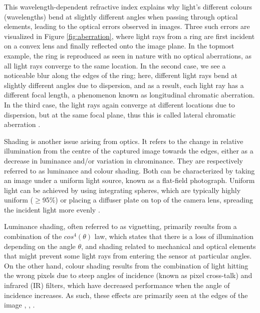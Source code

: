 This wavelength-dependent refractive index explains why light's different colours (wavelengths) bend at slightly different angles when passing through optical elements, leading to the optical errors observed in images. Three such errors are visualized in Figure  \ref{fig:aberration}, where light rays from a ring are first incident on a convex lens and finally reflected onto the image plane. In the topmost example, the ring is reproduced as seen in nature with no optical aberrations, as all light rays converge to the same location. In the second case, we see a noticeable blur along the edges of the ring; here, different light rays bend at slightly different angles due to dispersion, and as a result, each light ray has a different focal length, a phenomenon known as longitudinal chromatic aberration. In the third case, the light rays again converge at different locations due to dispersion, but at the same focal plane, thus this is called lateral chromatic aberration \cite[266-284]{Hecht}.

Shading is another issue arising from optics. It refers to the change in relative illumination from the centre of the captured image towards the edges, either as a decrease in luminance and/or variation in chrominance. They are respectively referred to as luminance and colour shading. Both can be characterized by taking an image under a uniform light source, known as a flat-field photograph. Uniform light can be achieved by using integrating spheres, which are typically highly uniform ($\ge$95\%) or placing a diffuser plate on top of the camera lens, spreading the incident light more evenly  \cite{ImageShading}.


Luminance shading, often referred to as vignetting, primarily results from a combination of the $cos^4(\theta)$ law, which states that there is a loss of illumination depending on the angle $\theta$, and shading related to mechanical and optical elements that might prevent some light rays from entering the sensor at particular angles. On the other hand, colour shading results from the combination of light hitting the wrong pixels due to steep angles of incidence (known as pixel cross-talk) and infrared (IR) filters, which have decreased performance when the angle of incidence increases. As such, these effects are primarily seen at the edges of the image  \cite[183-186]{Hecht}, \cite[251]{nakamura}, \cite{ImageShading}.


